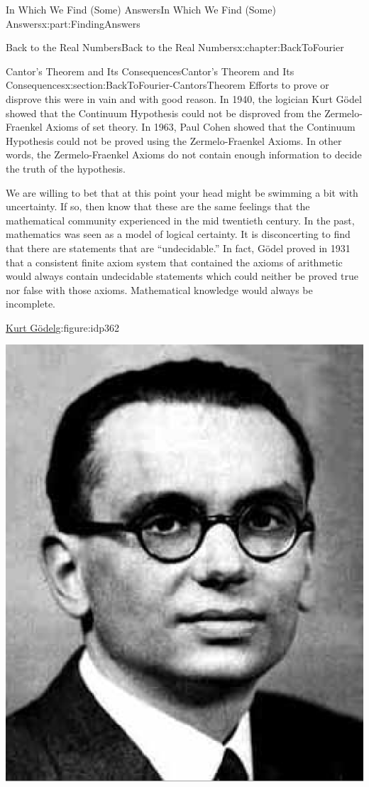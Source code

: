 \documentclass[oneside,10pt,]{book}
\numberwithin{equation}{section}
\begin{document}
\begin{partptx}{In Which We Find (Some) Answers}{}{In Which We Find (Some) Answers}{}{}{x:part:FindingAnswers}
\begin{chapterptx}{Back to the Real Numbers}{}{Back to the Real Numbers}{}{}{x:chapter:BackToFourier}
\begin{sectionptx}{Cantor's Theorem and Its Consequences}{}{Cantor's Theorem and Its Consequences}{}{}{x:section:BackToFourier-CantorsTheorem}
Efforts to prove or disprove this were in vain and with good reason.  In 1940, the logician Kurt Gödel showed that the Continuum Hypothesis could not be disproved from the Zermelo-Fraenkel Axioms of set theory.  In 1963, Paul Cohen showed that the Continuum Hypothesis could not be proved using the Zermelo-Fraenkel Axioms.  In other words, the Zermelo-Fraenkel Axioms do not contain enough information to decide the truth of the hypothesis.%
\par
We are willing to bet that at this point your head might be swimming a bit with uncertainty. If so, then know that these are the same feelings that the mathematical community experienced in the mid twentieth century. In the past, mathematics was seen as a model of logical certainty. It is disconcerting to find that there are statements that are ``undecidable.'' In fact, Gödel proved in 1931 that a consistent finite axiom system that contained the axioms of arithmetic would always contain undecidable statements which could neither be proved true nor false with those axioms. Mathematical knowledge would always be incomplete.%
\begin{figureptx}{\href{https://mathshistory.st-andrews.ac.uk/Biographies/Godel/}{Kurt Gödel}\protect\footnotemark{}}{g:figure:idp362}{}%
%
\begin{image}{0.325}{0.35}{0.325}%
\includegraphics[width=\linewidth]{images/Godel.png}

\end{image}
\end{figureptx}
\end{sectionptx}
\end{chapterptx}
\end{partptx}
\end{document}
